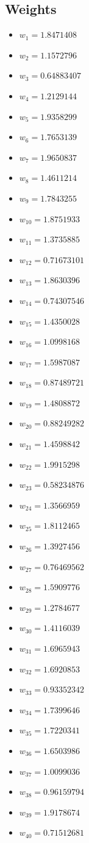 \documentclass[11pt]{article}
\begin{document}
\subsection*{Weights}
\begin{itemize}
\item $w_{1} = 1.8471408$
\item $w_{2} = 1.1572796$
\item $w_{3} = 0.64883407$
\item $w_{4} = 1.2129144$
\item $w_{5} = 1.9358299$
\item $w_{6} = 1.7653139$
\item $w_{7} = 1.9650837$
\item $w_{8} = 1.4611214$
\item $w_{9} = 1.7843255$
\item $w_{10} = 1.8751933$
\item $w_{11} = 1.3735885$
\item $w_{12} = 0.71673101$
\item $w_{13} = 1.8630396$
\item $w_{14} = 0.74307546$
\item $w_{15} = 1.4350028$
\item $w_{16} = 1.0998168$
\item $w_{17} = 1.5987087$
\item $w_{18} = 0.87489721$
\item $w_{19} = 1.4808872$
\item $w_{20} = 0.88249282$
\item $w_{21} = 1.4598842$
\item $w_{22} = 1.9915298$
\item $w_{23} = 0.58234876$
\item $w_{24} = 1.3566959$
\item $w_{25} = 1.8112465$
\item $w_{26} = 1.3927456$
\item $w_{27} = 0.76469562$
\item $w_{28} = 1.5909776$
\item $w_{29} = 1.2784677$
\item $w_{30} = 1.4116039$
\item $w_{31} = 1.6965943$
\item $w_{32} = 1.6920853$
\item $w_{33} = 0.93352342$
\item $w_{34} = 1.7399646$
\item $w_{35} = 1.7220341$
\item $w_{36} = 1.6503986$
\item $w_{37} = 1.0099036$
\item $w_{38} = 0.96159794$
\item $w_{39} = 1.9178674$
\item $w_{40} = 0.71512681$
\end{itemize}
\end{document}

